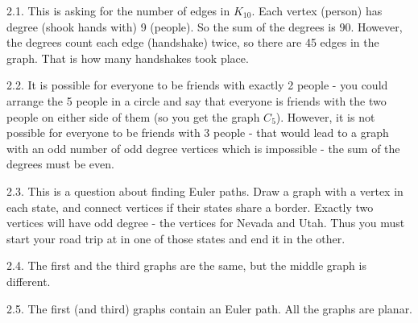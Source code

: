 \clearpage{}  \begin{itemize}
\begin{ans}{2.1.}
		This is asking for the number of edges in $K_{10}$.  Each vertex (person) has degree (shook hands with) 9 (people).  So the sum of the degrees is $90$.  However, the degrees count each edge (handshake) twice, so there are 45 edges in the graph.  That is how many handshakes took place.%
	
\end{ans}
\begin{ans}{2.2.}
		It is possible for everyone to be friends with exactly 2 people - you could arrange the 5 people in a circle and say that everyone is friends with the two people on either side of them (so you get the graph $C_5$).  However, it is not possible for everyone to be friends with 3 people - that would lead to a graph with an odd number of odd degree vertices which is impossible - the sum of the degrees must be even.  %
	
\end{ans}
\begin{ans}{2.3.}
		This is a question about finding Euler paths.  Draw a graph with a vertex in each state, and connect vertices if their states share a border.  Exactly two vertices will have odd degree - the vertices for Nevada and Utah.  Thus you must start your road trip at in one of those states and end it in the other. %
	
\end{ans}
\begin{ans}{2.4.}
		The first and the third graphs are the same, but the middle graph is different.
	
\end{ans}
\begin{ans}{2.5.}
		The first (and third) graphs contain an Euler path.  All the graphs are planar.
	

\end{ans}
\end{itemize}
